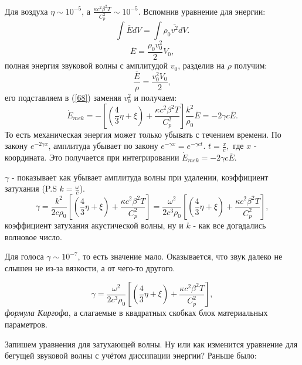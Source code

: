 \documentclass[14pt,a4paper,oneside]{extarticle}	%
\begin{document}
Для воздуха $ \eta \sim 10^{-5}  $, а $ \frac{\kappa c^{2}\beta^{2}T}{C_{p}^{2}} \sim 10^{-5}$.
Вспомнив уравнение для энергии:
\begin{equation*}
\int \overline{E}dV = \int \rho_{0}\overline{v^{2}}dV.
\end{equation*}
\begin{equation*}
\overline{E} = \frac{\rho_{0}v_{0}^{2}}{2}V_{0},
\end{equation*}
полная энергия звуковой волны с амплитудой $ v_{0} $, разделив на $ \rho $ получим:
\begin{equation*}
\frac{\overline{E}}{\rho} = \frac{v_{0}^{2}V_{0}}{2},
\end{equation*}
его подставляем в (\ref{68}) заменяя $ v_{0}^{2} $ и получаем:
\begin{equation*}
\dot{E}_{mek} = -\left[\left( \frac{4}{3}\eta + \xi\right) + \frac{\kappa c^{2}\beta^{2}T}{C_{p}^{2}} \right] \frac{k^{2}}{\rho_{0}}\overline{E} = -2\gamma c \overline{E}.
\end{equation*}
То есть механическая энергия может только убывать с течением времени. По закону $ e^{-2\gamma x} $, амплитуда убывает по закону $ e^{-\gamma x} = e^{-\gamma ct} $. $ t = \frac{x}{c}, $ где $ x $ - координата. Это получается при интегрировании $ \dot{E}_{mek} = -2\gamma c \overline{E} $.

$ \gamma $ - показывает как убывает амплитуда волны при удалении, коэффициент затухания (P.S $ k = \frac{\omega}{c}  $).
\begin{equation*}
\gamma = \frac{k^{2}}{2c\rho_{0}} \left[\left( \frac{4}{3}\eta + \xi\right) + \frac{\kappa c^{2}\beta^{2}T}{C_{p}^{2}} \right] = \frac{\omega^{2}}{2c^{3}\rho_{0}}\left[\left( \frac{4}{3}\eta + \xi\right) + \frac{\kappa c^{2}\beta^{2}T}{C_{p}^{2}} \right],
\end{equation*}
коэффициент затухания акустической волны, ну и $ k $ - как все догадались волновое число.

Для голоса $ \gamma \sim 10^{-7} $, то есть значение мало. Оказывается, что звук далеко не слышен не из-за вязкости, а от чего-то другого. 

\begin{equation*}
\gamma =  \frac{\omega^{2}}{2c^{3}\rho_{0}}\left[\left( \frac{4}{3}\eta + \xi\right) + \frac{\kappa c^{2}\beta^{2}T}{C_{p}^{2}} \right],
\end{equation*}
\textit{ формула Киргофа}, а слагаемые в квадратных скобках блок материальных параметров.

Запишем уравнения для затухающей волны. Ну или как изменится уравнение для бегущей звуковой волны с учётом диссипации энергии?
Раньше было:
\end{document}
